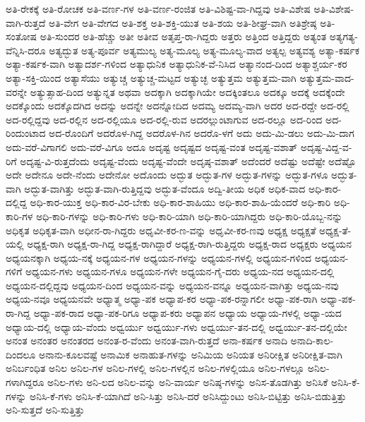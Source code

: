 {ಅತಿ-ರೇಕಕ್ಕೆ
ಅತಿ-ರೋಚಕ
ಅತಿ-ವರ್ಣ-ಗಳ
ಅತಿ-ವರ್ಣ-ರಂಜಿತ
ಅತಿ-ವಿಶಿಷ್ಟ-ವಾ-ಗಿದ್ದವು
ಅತಿ-ವಿಶೇಷ
ಅತಿ-ವಿಶೇಷ-ವಾಗಿ-ರುತ್ತದೆ
ಅತಿ-ವೇಗ
ಅತಿ-ವೇಗದ
ಅತಿ-ಶಕ್ತ
ಅತಿ-ಶಕ್ತಿ-ಯುತ
ಅತಿ-ಶಯ
ಅತಿ-ಶೀಘ್ರ-ವಾಗಿ
ಅತಿಶ್ರೇಷ್ಠ
ಅತಿ-ಸಂತೋಷ
ಅತಿ-ಸುಂದರ
ಅತಿ-ಹೆಚ್ಚು
ಅತೀ
ಅತೀವ
ಅತೃಪ್ತ-ರಾ-ಗಿದ್ದರು
ಅತ್ತರು
ಅತ್ತಿಂದ
ಅತ್ತಿದ್ದರು
ಅತ್ಯಂತ
ಅತ್ಯಗತ್ಯ-ವೆನ್ನಿಸಿ-ದರೂ
ಅತ್ಯದ್ಭುತ
ಅತ್ಯ-ಪೂರ್ವ
ಅತ್ಯಮುಲ್ಯ
ಅತ್ಯ-ಮೂಲ್ಯ
ಅತ್ಯ-ಮೂಲ್ಯ-ವಾದ
ಅತ್ಯಲ್ಪ
ಅತ್ಯವಶ್ಯ
ಅತ್ಯಾ-ಕರ್ಷಕ
ಅತ್ಯಾ-ಕರ್ಷಕ-ವಾಗಿ
ಅತ್ಯಾದರ್ಶ-ಗಳಿಂದ
ಅತ್ಯಾಧುನಿಕ
ಅತ್ಯಾಧುನಿಕ-ವೆ-ನಿಸಿದ
ಅತ್ಯಾನಂದ-ದಿಂದ
ಅತ್ಯಾಶ್ಚರ್ಯ-ಕರ
ಅತ್ಯಾ-ಸಕ್ತಿ-ಯಿಂದ
ಅತ್ಯಾಸೆಯು
ಅತ್ಯುಚ್ಚ
ಅತ್ಯುಚ್ಚ-ಮಟ್ಟದ
ಅತ್ಯುಚ್ಛ
ಅತ್ಯುತ್ತಮ
ಅತ್ಯುತ್ತಮ-ವಾಗಿ
ಅತ್ಯುತ್ತಮ-ವಾದ-ವರನ್ನೇ
ಅತ್ಯುತ್ಸಾಹ-ದಿಂದ
ಅತ್ಯುನ್ನತ
ಅಥವಾ
ಅದಕ್ಕಾಗಿ
ಅದಕ್ಕಾಗಿಯೇ
ಅದಕ್ಕಿಂತಲೂ
ಅದಕ್ಕೂ
ಅದಕ್ಕೆ
ಅದಕ್ಕೆಂದೇ
ಅದಕ್ಕೊಂದು
ಅದಕ್ಕೊದಗಿದ
ಅದನ್ನು
ಅದನ್ನೇ
ಅದನ್ನೋದಿದ
ಅದಮ್ಯ
ಅದಮ್ಯ-ವಾಗಿ
ಅದರ
ಅದ-ರದ್ದೇ
ಅದ-ರಲ್ಲಿ
ಅದ-ರಲ್ಲಿದ್ದವು
ಅದ-ರಲ್ಲಿನ
ಅದ-ರಲ್ಲಿಯೂ
ಅದ-ರಲ್ಲಿ-ರುವ
ಅದರಲ್ಲುಂಟಾಗುವ
ಅದ-ರಲ್ಲೂ
ಅದ-ರಿಂದ
ಅದ-ರಿಂದುಂಟಾದ
ಅದ-ರೊಂದಿಗೆ
ಅದರೊಳ-ಗಿದ್ದ
ಅದರೊಳ-ಗಿನ
ಅದರೊ-ಳಗೆ
ಅದು
ಅದು-ಮಿ-ಡಲು
ಅದು-ಮಿ-ದಾಗ
ಅದು-ವರೆ-ವಿಗಾಗಲಿ
ಅದು-ವರೆ-ವಿಗೂ
ಅದೂ
ಅದೃಷ್ಟ
ಅದೃಷ್ಟದ
ಅದೃಷ್ಟ-ವಂತ
ಅದೃಷ್ಟ-ವಶಾತ್
ಅದೃಷ್ಟ-ವಿದ್ದ-ವ-ರಿಗೆ
ಅದೃಷ್ಟ-ವಿ-ರುತ್ತದೆಂದು
ಅದೃಷ್ಟ-ವೆಂದು
ಅದೃಷ್ಟ-ವೆಂದೇ
ಅದೃಷ್ಠ-ವಶಾತ್
ಅದೆಂದರೆ
ಅದೆಷ್ಟು
ಅದೆಷ್ಟೇ
ಅದೆಷ್ಟೊ
ಅದೇ
ಅದೇನೂ
ಅದೇ-ನೆಂದು
ಅದೇನೋ
ಅದೊಂದು
ಅದ್ಭುತ
ಅದ್ಭುತ-ಗಳ
ಅದ್ಭುತ-ಗಳನ್ನು
ಅದ್ಭುತ-ಗಳೂ
ಅದ್ಭುತ-ವಾಗಿ
ಅದ್ಭುತ-ವಾಗಿತ್ತು
ಅದ್ಭುತ-ವಾಗಿ-ರುತ್ತಿದ್ದವು
ಅದ್ಭುತ-ವೆಂದೂ
ಅದ್ವಿ-ತೀಯ
ಅಧಿಕ
ಅಧಿಕ-ವಾದ
ಅಧಿ-ಕಾರ-ದಲ್ಲಿದ್ದ
ಅಧಿ-ಕಾರ-ಯುಕ್ತ
ಅಧಿ-ಕಾರ-ವಿರ-ಬೇಕು
ಅಧಿ-ಕಾರ-ಶಾಹಿಯು
ಅಧಿ-ಕಾರ-ಶಾಹಿ-ಯೆಂದರೆ
ಅಧಿ-ಕಾರಿ
ಅಧಿ-ಕಾರಿ-ಗಳ
ಅಧಿ-ಕಾರಿ-ಗಳನ್ನು
ಅಧಿ-ಕಾರಿ-ಗಳು
ಅಧಿ-ಕಾರಿ-ಯಾಗಿ
ಅಧಿ-ಕಾರಿ-ಯಾಗಿದ್ದರು
ಅಧಿ-ಕಾರಿ-ಯೊಬ್ಬ-ನನ್ನು
ಅಧಿಕೃತ
ಅಧಿಕೃತ-ವಾಗಿ
ಅಧೀನ-ರಾ-ಗಿದ್ದರು
ಅಧೃವೀ-ಕರ-ಣ-ವನ್ನು
ಅಧೃವೀ-ಕರ-ಣವು
ಅಧ್ಯಕ್ಷ
ಅಧ್ಯಕ್ಷತೆ
ಅಧ್ಯಕ್ಷ-ತೆ-ಯಲ್ಲಿ
ಅಧ್ಯಕ್ಷ-ರಾಗಿ
ಅಧ್ಯಕ್ಷ-ರಾ-ಗಿದ್ದ
ಅಧ್ಯಕ್ಷ-ರಾಗಿದ್ದಾರೆ
ಅಧ್ಯಕ್ಷ-ರಾಗಿ-ರುತ್ತಿದ್ದರು
ಅಧ್ಯಕ್ಷ-ರಾದ
ಅಧ್ಯಕ್ಷರು
ಅಧ್ಯಯನ
ಅಧ್ಯಯನಕ್ಕಾಗಿ
ಅಧ್ಯಯ-ನಕ್ಕೆ
ಅಧ್ಯಯನ-ಗಳ
ಅಧ್ಯಯನ-ಗಳನ್ನು
ಅಧ್ಯಯನ-ಗಳಲ್ಲಿ
ಅಧ್ಯಯನ-ಗಳಿಂದ
ಅಧ್ಯಯನ-ಗಳಿಗೆ
ಅಧ್ಯಯನ-ಗಳು
ಅಧ್ಯಯನ-ಗಳೂ
ಅಧ್ಯಯನ-ಗಳೇ
ಅಧ್ಯಯನ-ಗೈ-ದರು
ಅಧ್ಯಯ-ನದ
ಅಧ್ಯಯನ-ದಲ್ಲಿ
ಅಧ್ಯಯನ-ದಲ್ಲಿದ್ದವು
ಅಧ್ಯಯನ-ದಿಂದ
ಅಧ್ಯಯನ-ವನ್ನು
ಅಧ್ಯಯನ-ವನ್ನೂ
ಅಧ್ಯಯನ-ವಾಗಿತ್ತು
ಅಧ್ಯಯ-ನವು
ಅಧ್ಯಯ-ನವೂ
ಅಧ್ಯಯನವೇ
ಅಧ್ಯಾತ್ಮ
ಅಧ್ಯಾ-ಪಕ
ಅಧ್ಯಾಪ-ಕರ
ಅಧ್ಯಾ-ಪಕ-ರನ್ನಾಗಲೀ
ಅಧ್ಯಾ-ಪಕ-ರಾಗಿ
ಅಧ್ಯಾ-ಪಕ-ರಾ-ಗಿದ್ದ
ಅಧ್ಯಾ-ಪಕ-ರಾದ
ಅಧ್ಯಾ-ಪಕ-ರಿಗೂ
ಅಧ್ಯಾಪ-ಕರು
ಅಧ್ಯಾಪನ
ಅಧ್ಯಾಯ
ಅಧ್ಯಾಯ-ಗಳಲ್ಲಿ
ಅಧ್ಯಾ-ಯದ
ಅಧ್ಯಾಯ-ದಲ್ಲಿ
ಅಧ್ಯಾಯ-ವೆಂದು
ಅಧ್ವರ್ಯು
ಅಧ್ವರ್ಯು-ಗಳು
ಅಧ್ವರ್ಯು-ತನ-ದಲ್ಲಿ
ಅಧ್ವರ್ಯು-ತನ-ದಲ್ಲಿಯೇ
ಅನಂತ
ಅನಂತರ
ಅನಂತರದ
ಅನಂತ-ರ-ವೆಂದು
ಅನಂತ-ವಾಗಿ-ರುತ್ತದೆ
ಅನಾ-ಕರ್ಷಕ
ಅನಾದಿ
ಅನಾದಿ-ಕಾಲ-ದಿಂದಲೂ
ಅನಾನು-ಕೂಲವಷ್ಟೆ
ಅನಾಮಿಕ
ಅನಾಹುತ-ಗಳನ್ನು
ಅನಿಮಿಯ
ಅನಿಯತ
ಅನಿರೀಕ್ಷಿತ
ಅನಿರೀಕ್ಷಿತ-ವಾಗಿ
ಅನಿರ್ಬಂಧಿತ
ಅನಿಲ
ಅನಿಲ-ಗಳ
ಅನಿಲ-ಗಳಲ್ಲಿ
ಅನಿಲ-ಗಳಲ್ಲಿನ
ಅನಿಲ-ಗಳಲ್ಲಿಯೂ
ಅನಿಲ-ಗಳಲ್ಲೂ
ಅನಿಲ-ಗಳಾಗಿದ್ದರೂ
ಅನಿಲ-ಗಳು
ಅನಿ-ಲದ
ಅನಿಲ-ವನ್ನು
ಅನಿ-ವಾರ್ಯ
ಅನಿಷ್ಠ-ಗಳನ್ನು
ಅನಿಸ-ತೊಡಗಿತ್ತು
ಅನಿಸಿಕೆ
ಅನಿಸಿ-ಕೆ-ಗಳನ್ನು
ಅನಿಸಿ-ಕೆ-ಗಳು
ಅನಿಸಿ-ಕೆ-ಯಾಗಿದೆ
ಅನಿ-ಸಿತ್ತು
ಅನಿಸಿ-ದರೆ
ಅನಿಸಿದ್ದುಂಟು
ಅನಿಸಿ-ಬಿಟ್ಟಿತ್ತು
ಅನಿಸಿ-ಬಿಡುತ್ತಿತ್ತು
ಅನಿ-ಸುತ್ತದೆ
ಅನಿ-ಸುತ್ತಿತ್ತು
}
